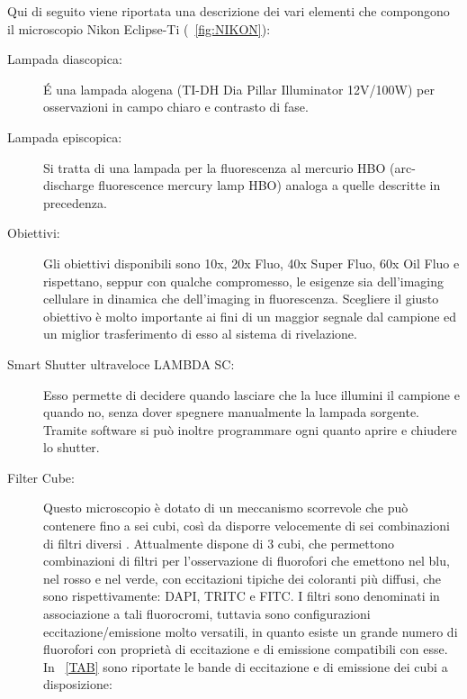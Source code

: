Qui di seguito viene riportata una descrizione dei vari elementi che compongono il microscopio Nikon Eclipse-Ti (\figurename~\ref{fig:NIKON}):

\begin{description}

\item[Lampada diascopica:]
\'E una lampada alogena (TI-DH Dia Pillar Illuminator 12V/100W) per osservazioni in campo chiaro e contrasto di fase.

\item[Lampada episcopica:]
Si tratta di una lampada per la fluorescenza al mercurio HBO (arc-discharge fluorescence mercury lamp HBO) analoga a quelle descritte in precedenza.

\item[Obiettivi:]
Gli obiettivi disponibili sono 10x, 20x Fluo, 40x Super Fluo, 60x Oil Fluo e rispettano, seppur con qualche compromesso, le esigenze sia dell'imaging cellulare in dinamica che dell'imaging in fluorescenza. 
Scegliere il giusto obiettivo è molto importante ai fini di un maggior segnale dal campione ed un miglior trasferimento di esso al sistema di rivelazione.

\item[Smart Shutter ultraveloce LAMBDA SC:]
Esso permette di decidere quando lasciare che la luce illumini il campione e quando no, senza dover spegnere manualmente la lampada sorgente.
Tramite software si può inoltre programmare ogni quanto aprire e chiudere lo shutter.

\item[Filter Cube:]
Questo microscopio è dotato di un meccanismo scorrevole che può contenere fino a sei cubi, così da disporre velocemente di sei combinazioni di filtri diversi \cite{Nikon1}. 
Attualmente dispone di 3 cubi, che permettono combinazioni di filtri per l'osservazione di fluorofori che emettono nel blu, nel rosso e nel verde, con eccitazioni tipiche dei coloranti più diffusi, che sono rispettivamente: DAPI, TRITC e FITC. 
I filtri sono denominati in associazione a tali fluorocromi, tuttavia sono configurazioni eccitazione/emissione molto versatili, in quanto esiste un grande numero di fluorofori con proprietà di eccitazione e di emissione compatibili con esse. 
In \tablename~\ref{TAB} sono riportate le bande di eccitazione e di emissione dei cubi a disposizione:


\end{description}
